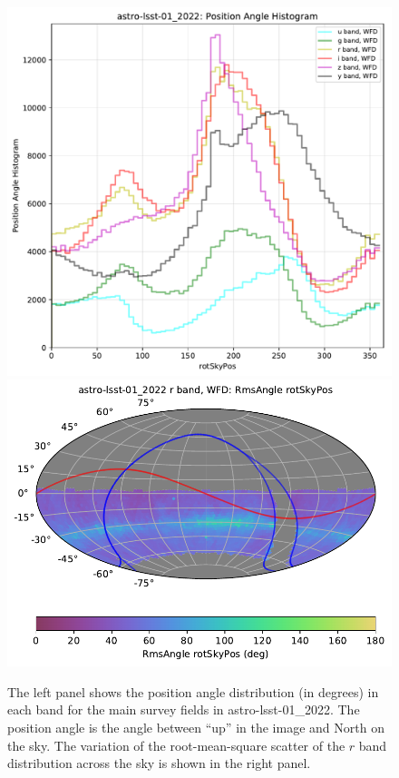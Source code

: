 \documentclass[DM,lsstdraft,authoryear,toc]{lsstdoc}
\begin{document}
\begin{figure}[th!]
\vskip -0.0in
\includegraphics[angle=0,width=0.49\hsize,clip]{figures/astro-lsst-01_2022-rotpos_hist_per_filter.pdf}
\includegraphics[angle=0,width=0.49\hsize,clip]{figures/astro-lsst-01_2022_RmsAngle_rotSkyPos_r_band_WFD_OPSI_SkyMap.pdf}
\vskip -0.1in
\caption{The left panel shows the position angle distribution (in degrees) in each band for the
main survey fields in astro-lsst-01\_2022. The position angle is the angle between
``up'' in the image and North on the sky. The variation of the root-mean-square scatter of the
$r$ band distribution across the sky is shown in the right panel.}
\label{fig:baseline_rotator}
\end{figure}
\end{document}
